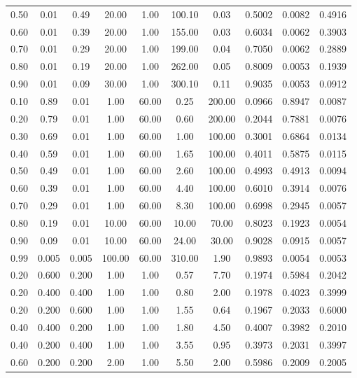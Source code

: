 \documentclass[journal, onecolumn]{IEEEtran}
\begin{document}
\begin{table}[!th]
\begin{tabular}{ccc|cccc|ccc}
0.50 & 0.01 & 0.49 & 20.00 & 1.00 & 100.10 & 0.03 & 0.5002 & 0.0082 & 0.4916 \\
0.60 & 0.01 & 0.39 & 20.00 & 1.00 & 155.00 & 0.03 & 0.6034 & 0.0062 & 0.3903 \\
0.70 & 0.01 & 0.29 & 20.00 & 1.00 & 199.00 & 0.04 & 0.7050 & 0.0062 & 0.2889 \\
0.80 & 0.01 & 0.19 & 20.00 & 1.00 & 262.00 & 0.05 & 0.8009 & 0.0053 & 0.1939 \\
0.90 & 0.01 & 0.09 & 30.00 & 1.00 & 300.10 & 0.11 & 0.9035 & 0.0053 & 0.0912 \\
\hline
0.10 & 0.89 & 0.01 & 1.00 & 60.00 & 0.25 & 200.00 & 0.0966 & 0.8947 & 0.0087 \\
0.20 & 0.79 & 0.01 & 1.00 & 60.00 & 0.60 & 200.00 & 0.2044 & 0.7881 & 0.0076 \\
0.30 & 0.69 & 0.01 & 1.00 & 60.00 & 1.00 & 100.00 & 0.3001 & 0.6864 & 0.0134 \\
0.40 & 0.59 & 0.01 & 1.00 & 60.00 & 1.65 & 100.00 & 0.4011 & 0.5875 & 0.0115 \\
0.50 & 0.49 & 0.01 & 1.00 & 60.00 & 2.60 & 100.00 & 0.4993 & 0.4913 & 0.0094 \\
0.60 & 0.39 & 0.01 & 1.00 & 60.00 & 4.40 & 100.00 & 0.6010 & 0.3914 & 0.0076 \\
0.70 & 0.29 & 0.01 & 1.00 & 60.00 & 8.30 & 100.00 & 0.6998 & 0.2945 & 0.0057 \\
0.80 & 0.19 & 0.01 & 10.00 & 60.00 & 10.00 & 70.00 & 0.8023 & 0.1923 & 0.0054 \\
0.90 & 0.09 & 0.01 & 10.00 & 60.00 & 24.00 & 30.00 & 0.9028 & 0.0915 & 0.0057 \\
0.99 & 0.005 & 0.005 & 100.00 & 60.00 & 310.00 & 1.90 & 0.9893 & 0.0054 & 0.0053 \\
\hline
0.20 & 0.600 & 0.200 & 1.00 & 1.00 & 0.57 & 7.70 & 0.1974 & 0.5984 & 0.2042 \\
0.20 & 0.400 & 0.400 & 1.00 & 1.00 & 0.80 & 2.00 & 0.1978 & 0.4023 & 0.3999 \\
0.20 & 0.200 & 0.600 & 1.00 & 1.00 & 1.55 & 0.64 & 0.1967 & 0.2033 & 0.6000 \\
0.40 & 0.400 & 0.200 & 1.00 & 1.00 & 1.80 & 4.50 & 0.4007 & 0.3982 & 0.2010 \\
0.40 & 0.200 & 0.400 & 1.00 & 1.00 & 3.55 & 0.95 & 0.3973 & 0.2031 & 0.3997 \\
0.60 & 0.200 & 0.200 & 2.00 & 1.00 & 5.50 & 2.00 & 0.5986 & 0.2009 & 0.2005 \\
\hline
\end{tabular}
\end{table}
\end{document}

